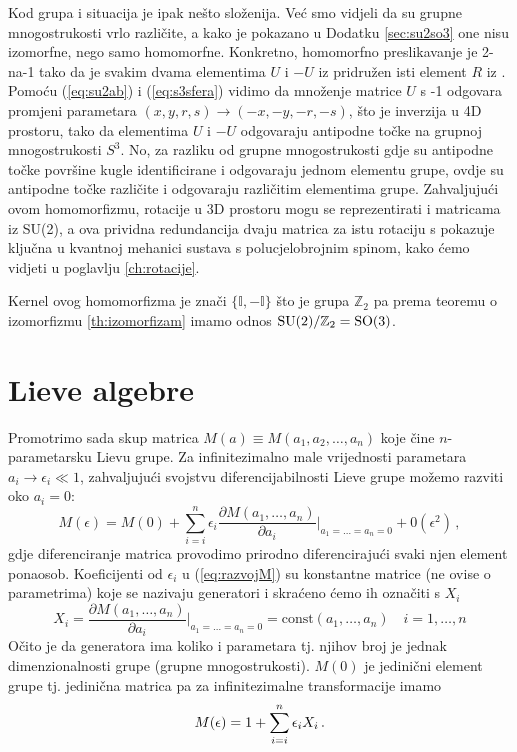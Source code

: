 Kod grupa  i  situacija je ipak nešto složenija. Već smo vidjeli
da su grupne mnogostrukosti vrlo različite, a kako je
pokazano u Dodatku \ref{sec:su2so3} one
nisu izomorfne, nego samo homomorfne.
Konkretno, homomorfno preslikavanje je 2-na-1 tako da je svakim dvama elementima 
$U$ i $-U$ iz  pridružen isti element $R$ iz .
Pomoću (\ref{eq:su2ab}) i (\ref{eq:s3sfera}) vidimo da množenje matrice $U$
s -1 odgovara promjeni parametara $(x, y, r, s) \to (-x, -y, -r, -s)$,
što je inverzija u 4D prostoru, tako da elementima $U$ i $-U$ odgovaraju
antipodne točke na grupnoj mnogostrukosti $S^3$. No, za razliku od
grupne mnogostrukosti  gdje su antipodne točke površine kugle
identificirane i odgovaraju jednom elementu grupe, ovdje su antipodne
točke različite i odgovaraju različitim elementima grupe.
Zahvaljujući ovom homomorfizmu, rotacije u 3D prostoru mogu se reprezentirati
i matricama iz SU(2), a ova prividna redundancija dvaju matrica za
istu rotaciju s pokazuje ključna u kvantnoj mehanici sustava s polucjelobrojnim
spinom, kako ćemo vidjeti u poglavlju \ref{ch:rotacije}.

Kernel ovog homomorfizma je znači $\{\mathbb{I}, -\mathbb{I}\}$ što je
grupa $\mathbb{Z}_2$ pa prema
teoremu o izomorfizmu \ref{th:izomorfizam} imamo
odnos $\mathrm{SU}(2)/\mathbb{Z}_2 = \mathrm{SO}(3)$.





\section{Lieve algebre}
\label{sec:lievealgebre}

Promotrimo sada skup matrica $M(a)\equiv M(a_1, a_2, \ldots, a_n)$ koje
čine $n$-pa\-ra\-me\-tar\-sku Lievu grupe.
Za infinitezimalno male vrijednosti parametara $a_i \to \epsilon_i \ll 1$, zahvaljujući
svojstvu diferencijabilnosti Lieve grupe možemo razviti oko $a_i = 0$:
\begin{equation}
   M(\epsilon)=M(0)+ \sum_{i=i}^{n}\epsilon_i \frac{\partial M(a_1, \ldots, a_n)}
 {\partial a_i}\Bigg|_{a_1=\ldots =a_n=0} + 0(\epsilon^2) \,,
 \label{eq:razvojM}
\end{equation}
gdje diferenciranje matrica provodimo prirodno diferencirajući svaki njen
element ponaosob. Koeficijenti od $\epsilon_i$ u (\ref{eq:razvojM}) su
konstantne matrice (ne ovise o parametrima) koje se nazivaju generatori
i skraćeno ćemo ih označiti s $X_i$
\begin{equation}
X_i =  \frac{\partial M(a_1, \ldots, a_n)}
 {\partial a_i}\Bigg|_{a_1=\ldots =a_n=0} = \textrm{const}(a_1, \ldots, a_n)
   \quad i=1, \ldots, n 
   \label{eq:defXi}
\end{equation}
Očito je da generatora ima koliko i parametara tj. njihov broj je jednak
dimenzionalnosti grupe (grupne mnogostrukosti).  $M(0)$ je jedinični
element grupe tj. jedinična matrica pa za infinitezimalne transformacije imamo
\begin{equation}
  M(\epsilon)=1 + \sum_{i=i}^{n}\epsilon_i X_i \,. 
\end{equation}

